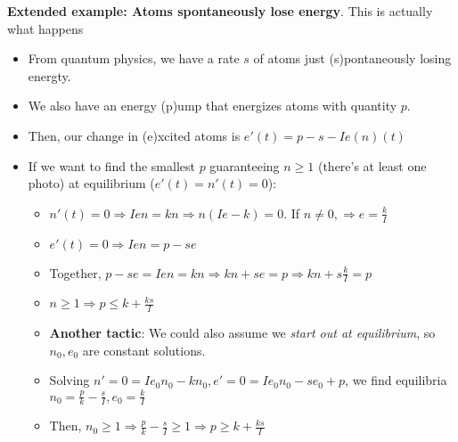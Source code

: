 \documentclass[11pt, oneside]{article}   	%
\begin{document}
\textbf{Extended example: Atoms spontaneously lose energy}.  This is actually what happens
\begin{itemize}
\item From quantum physics, we have a rate $s$ of atoms just (s)pontaneously losing energty.
\item We also have an energy (p)ump that energizes atoms with quantity $p$.
\item Then, our change in (e)xcited atoms is $e'(t) = p -s - Ie(n)(t)$
\item If we want to find the smallest $p$ guaranteeing $n \geq 1$ (there's at least one photo) at equilibrium ($e'(t) = n'(t) = 0$):
\begin{itemize}
\item $n'(t) = 0 \Rightarrow Ien = kn \Rightarrow n(Ie-k) = 0$.  If $n \neq 0, \Rightarrow e = \frac{k}{I}$
\item $e'(t) = 0 \Rightarrow Ien = p - se$
\item Together, $p - se = Ien = kn \Rightarrow kn + se = p \Rightarrow kn + s\frac{k}{I} = p$
\item $n \geq 1 \Rightarrow p \leq  k +  \frac{ks}{I}$
\item \textbf{Another tactic}: We could also assume we \emph{start out at equilibrium}, so $n_0, e_0$ are constant solutions.
\item Solving $n' = 0 = Ie_0n_0 - kn_0, e' = 0 = Ie_0n_0 - se_0 + p$, we find equilibria $n_0 = \frac{p}{k} - \frac{s}{I}, e_0 = \frac{k}{I}$
\item Then,  $n_0 \geq 1 \Rightarrow  \frac{p}{k} - \frac{s}{I} \geq 1 \Rightarrow p \geq k + \frac{ks}{I}$
\end{itemize}
\end{itemize}
\end{document}
